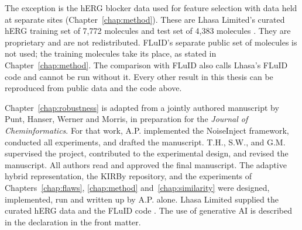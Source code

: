 The exception is the hERG blocker data used for feature selection with data held at separate sites (Chapter~\ref{chap:method}). These are Lhasa Limited's curated hERG training set of 7,772 molecules and test set of 4,383 molecules \citep{Hanser2025}. They are proprietary and are not redistributed. FLuID's separate public set of molecules is not used; the training molecules take its place, as stated in Chapter~\ref{chap:method}. The comparison with FLuID also calls Lhasa's FLuID code and cannot be run without it. Every other result in this thesis can be reproduced from public data and the code above.

Chapter~\ref{chap:robustness} is adapted from a jointly authored manuscript by Punt, Hanser, Werner and Morris, in preparation for the \textit{Journal of Cheminformatics}. For that work, A.P. implemented the NoiseInject framework, conducted all experiments, and drafted the manuscript. T.H., S.W., and G.M. supervised the project, contributed to the experimental design, and revised the manuscript. All authors read and approved the final manuscript. The adaptive hybrid representation, the KIRBy repository, and the experiments of Chapters~\ref{chap:flaws}, \ref{chap:method} and~\ref{chap:similarity} were designed, implemented, run and written up by A.P. alone. Lhasa Limited supplied the curated hERG data and the FLuID code \citep{Hanser2025}. The use of generative AI is described in the declaration in the front matter.
